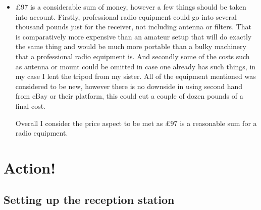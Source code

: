 \documentclass{article}
\begin{document}
\begin{itemize}
        \item[] £97 is a considerable sum of money, however a few things should be taken into account. Firstly, professional radio equipment could go into several thousand pounds just for the receiver, not including antenna or filters. That is comparatively more expensive than an amateur setup that will do exactly the same thing and would be much more portable than a bulky machinery that a professional radio equipment is. And secondly some of the costs such as antenna or mount could be omitted in case one already has such things, in my case I lent the tripod from my sister. All of the equipment mentioned was considered to be new, however there is no downside in using second hand from eBay or their platform, this could cut a couple of dozen pounds of a final cost.

        Overall I consider the price aspect to be met as £97 is a reasonable sum for a radio equipment.

    \end{itemize}

\section{Action!}
    \subsection{Setting up the reception station}
\end{document}
